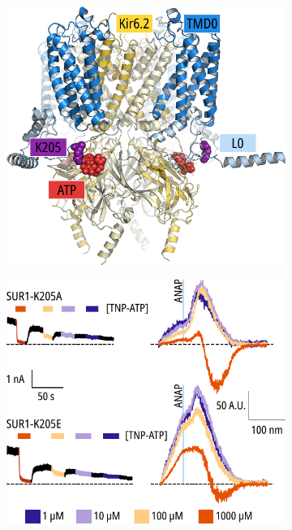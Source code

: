 \begin{figure}[hbtp]
	\centering
	\begin{subfigure}[t]{0.45\textwidth}
		\caption{}\label{ch6fig:k205_1}
		\centering
		\includegraphics[width=\textwidth]{k205_1.pdf}
	\end{subfigure}
	\hfill
	\begin{subfigure}[t]{0.45\textwidth}
		\caption{}\label{ch6fig:k205_2}
		\centering
		\includegraphics[width=\textwidth]{k205_2.pdf}

\end{subfigure}
\end{figure}
